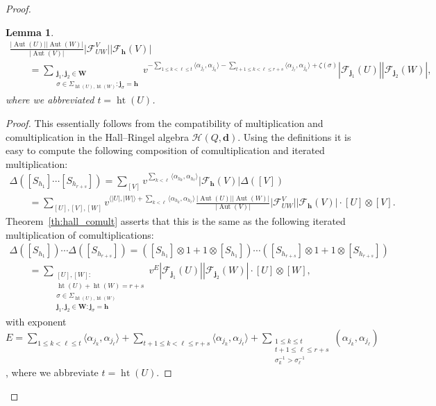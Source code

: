 \documentclass[pdftex]{sigma}
\numberwithin{equation}{section}
\newtheorem{Lemma}[Theorem]{Lemma}
\begin{document}
\begin{proof}
\begin{Lemma}
\begin{gather}
\frac{|\operatorname{Aut}(U)||\operatorname{Aut}(W)|}{|\operatorname{Aut}(V)|}\big|\mathcal{F}^V_{UW}\big||\mathcal{F}_\mathbf{h}(V)|
\\
\qquad
 =\sum\limits_{\substack{\mathbf{j}_1,\mathbf{j}_2\in\mathbf{W}\\
\sigma\in\Sigma_{\operatorname{ht}(U),\operatorname{ht}(W)}: \mathbf{j}_\sigma=\mathbf{h}}}v^{-\sum\limits_{1\le
k<\ell\le t}\langle\alpha_{j_\ell},\alpha_{j_k}\rangle-\sum\limits_{t+1\le k<\ell\le
r+s}\langle\alpha_{j_\ell},\alpha_{j_k}\rangle+\zeta(\sigma)}|\mathcal{F}_{\mathbf{j}_1}(U)||\mathcal{F}_{\mathbf{j}_2}(W)|,
\label{eq:flag_identity}
\end{gather}
where we abbreviated $t=\operatorname{ht}(U)$.
\end{Lemma}

\begin{proof}
This essentially follows from the compatibility of multiplication and comultiplication in the Hall--Ringel algebra
$\mathcal{H}(Q,\mathbf{d})$.
Using the def\/initions it is easy to compute the following composition of comultiplication and iterated multiplication:
\begin{gather*}
\Delta([S_{h_1}]\cdots[S_{h_{r+s}}])=\sum\limits_{[V]}v^{\sum\limits_{k<\ell}\langle
\alpha_{h_k},\alpha_{h_\ell}\rangle}|\mathcal{F}_\mathbf{h}(V)|\Delta([V])
\\
\qquad
 =\sum\limits_{[U],[V],[W]}v^{\langle|U|,|W|\rangle+\sum\limits_{k<\ell}\langle\alpha_{h_k},\alpha_{h_\ell}\rangle}
\frac{|\operatorname{Aut}(U)||\operatorname{Aut}(W)|}{|\operatorname{Aut}(V)|}\big|\mathcal{F}^V_{UW}\big||\mathcal{F}_\mathbf{h}(V)|\cdot[U]\otimes[V].
\end{gather*}
Theorem~\ref{th:hall_comult} asserts that this is the same as the following iterated multiplication of
comultiplications:
\begin{gather*}
\Delta([S_{h_1}])\cdots\Delta([S_{h_{r+s}}])=([S_{h_1}]\otimes1+1\otimes[S_{h_1}])\cdots([S_{h_{r+s}}]\otimes1+1\otimes[S_{h_{r+s}}])
\\
\qquad
 =\sum\limits_{\substack{[U],[W]:\\ \operatorname{ht}(U)+\operatorname{ht}(W)=r+s\\
\sigma\in\Sigma_{\operatorname{ht}(U),\operatorname{ht}(W)}\\
\mathbf{j}_1,\mathbf{j}_2\in\mathbf{W}: \mathbf{j}_\sigma=\mathbf{h}}}v^E
|\mathcal{F}_{\mathbf{j}_1}(U)||\mathcal{F}_{\mathbf{j}_2}(W)|\cdot [U]\otimes[W],
\end{gather*}
with exponent $E=\sum\limits_{1\le k<\ell\le t}\langle\alpha_{j_k},\alpha_{j_\ell}\rangle
+\sum\limits_{t+1\le k<\ell\le r+s}\langle\alpha_{j_k},\alpha_{j_\ell}\rangle
+\sum\limits_{\substack{1\le k\le t\\t+1\le\ell\le r+s\\\sigma_k^{-1}>\sigma_\ell^{-1}}}(\alpha_{j_k},\alpha_{j_\ell})$,
where we abbreviate $t=\operatorname{ht}(U)$.


\end{proof}
\end{proof}
\end{document}
